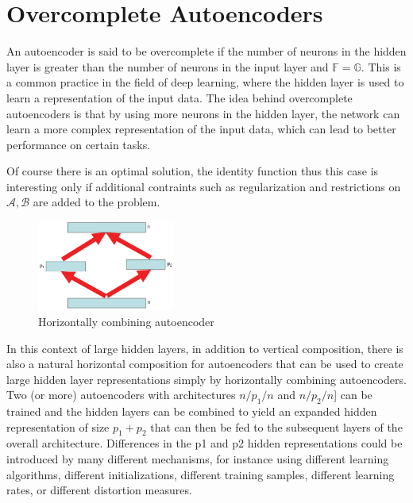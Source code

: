 \section{Overcomplete Autoencoders}
An autoencoder is said to be overcomplete if the number of neurons in the hidden layer is greater than the number of neurons in the input layer and $\mathbb{F} = \mathbb{G}$. This is a common practice in the field of deep learning, where the hidden layer is used to learn a representation of the input data. The idea behind overcomplete autoencoders is that by using more neurons in the hidden layer, the network can learn a more complex representation of the input data, which can lead to better performance on certain tasks.

Of course there is an optimal solution, the identity function thus this case is interesting only if additional contraints such as regularization and restrictions on $\mathcal{A,B}$ are added to the problem.

\begin{center}
    \begin{figure}[H]
        \centering
        \includegraphics[width=0.4\textwidth]{./Images/Overcomplete_autoencoders.png}
        \caption{Horizontally combining autoencoder}
    \end{figure}
\end{center}

In this context of large hidden layers, in addition to vertical composition, there is also
a natural horizontal composition for autoencoders that can be used to create large hidden
layer representations simply by horizontally combining autoencoders. Two (or
more) autoencoders with architectures $n/p_1/n$ and $n/p_2/n$] can be trained and the hidden
layers can be combined to yield an expanded hidden representation of size $p_1 + p_2$ that
can then be fed to the subsequent layers of the overall architecture. Differences in the
p1 and p2 hidden representations could be introduced by many different mechanisms, for
instance using different learning algorithms, different initializations, different training samples, different learning rates, or different distortion measures.